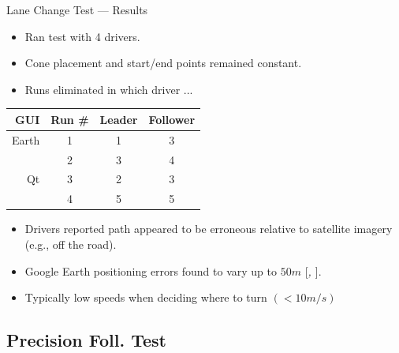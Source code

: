 \documentclass{beamer}
\newcommand{\citeitem}[1]{[\emph{\Citeauthor*{#1}, \citeyear{#1} }]}
\begin{document}
    \begin{frame}{Lane Change Test --- Results}
      \begin{itemize} \footnotesize
        \item Ran test with 4 drivers.
        \item Cone placement and start/end points remained constant.
        \item Runs eliminated in which driver ... 
      \end{itemize}
      \vspace{-10pt}
      \begin{table}[htbp] \centering \footnotesize
        \begin{tabular}{rc|cc}
          GUI&    Run \#  &     Leader&    Follower \\\hline\hline
          Earth&      1       &       1   &    3 \\
               &      2       &       3   &    4 \\ \hline
          Qt   &      3       &       2   &    3 \\
               &      4       &       5   &    5 \\ \hline   
        \end{tabular}
        \label{tab:lanechangeresults}
      \end{table}
      \begin{itemize} \footnotesize
        \item Drivers reported path appeared to be erroneous relative to satellite imagery (e.g., off the road).
        \item Google Earth positioning errors found to vary up to $50m$ \citeitem{ge_accuracy}.
        \item Typically low speeds when deciding where to turn $(<10m/s)$
      \end{itemize}
    \end{frame}



  \subsection{Precision Foll. Test}
\end{document}
